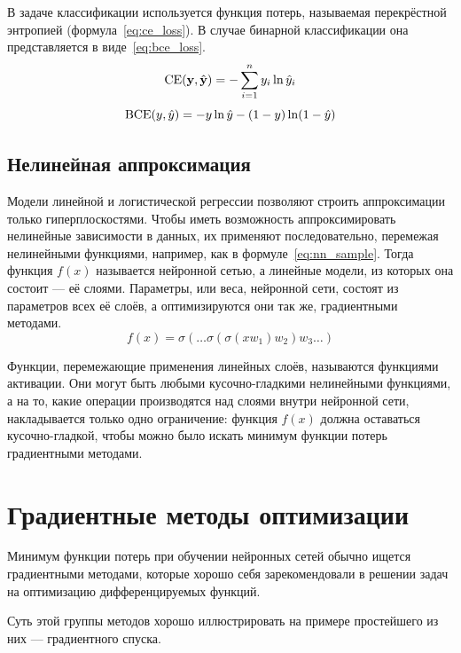 В задаче классификации используется функция потерь, называемая перекрёстной энтропией (формула \ref*{eq:ce_loss}). В случае бинарной классификации она представляется в виде \ref*{eq:bce_loss}.
\begin{equation}
    \label{eq:ce_loss}
    \operatorname{CE}(\mathbf{y},\hat{\mathbf{y}})=-\sum\limits_{i=1}^n y_i \ln \hat{y}_i
\end{equation}
\begin{equation}
    \label{eq:bce_loss}
    \operatorname{BCE}(y,\hat{y})=-y \ln \hat{y} - (1-y)\ln (1-\hat{y})
\end{equation}

\subsection{Нелинейная аппроксимация}

Модели линейной и логистической регрессии позволяют строить аппроксимации только гиперплоскостями. Чтобы иметь возможность аппроксимировать нелинейные зависимости в данных, их применяют последовательно, перемежая нелинейными функциями, например, как в формуле \ref*{eq:nn_sample}. Тогда функция $f(x)$ называется нейронной сетью, а линейные модели, из которых она состоит --- её слоями. Параметры, или веса, нейронной сети, состоят из параметров всех её слоёв, а оптимизируются они так же, градиентными методами.
\begin{equation}
    \label{eq:nn_sample}
    f(x)=\sigma(\dots \sigma(\sigma(xw_1)w_2)w_3 \dots)
\end{equation}

Функции, перемежающие применения линейных слоёв, называются функциями активации. Они могут быть любыми кусочно-гладкими нелинейными функциями, а на то, какие операции производятся над слоями внутри нейронной сети, накладывается только одно ограничение: функция $f(x)$ должна оставаться кусочно-гладкой, чтобы можно было искать минимум функции потерь градиентными методами.

\section{Градиентные методы оптимизации}

Минимум функции потерь при обучении нейронных сетей обычно ищется градиентными методами, которые хорошо себя зарекомендовали в решении задач на оптимизацию дифференцируемых функций.

Суть этой группы методов хорошо иллюстрировать на примере простейшего из них --- градиентного спуска.

